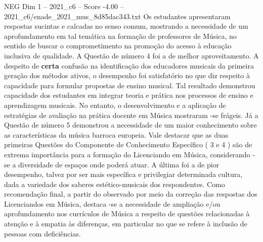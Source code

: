 \begin{textsample}{NEG Dim 1 – 2021\_c6 – Score -4.00 – 2021\_c6/enade\_2021\_mus\_8d85dac343.txt}
Os estudantes apresentaram respostas sucintas e calcadas no senso comum, mostrando a necessidade de um aprofundamento em tal temática na formação de professores de Música, no sentido de buscar o comprometimento na promoção do acesso à educação inclusiva de qualidade.
A Questão de número 4 foi a de melhor aproveitamento.
A despeito de \textbf{certa} confusão na identificação dos educadores musicais da primeira geração dos métodos ativos, o desempenho foi satisfatório no que diz respeito à capacidade para formular propostas de ensino musical.
Tal resultado demonstrou capacidade dos estudantes em integrar teoria e prática nos processos de ensino e aprendizagem musicais.
No entanto, o desenvolvimento e a aplicação de estratégias de avaliação na prática docente em Música mostraram -se frágeis.
Já a Questão de número 5 demonstrou a necessidade de um maior conhecimento sobre as características da música barroca europeia.
Vale destacar que as duas primeiras Questões do Componente de Conhecimento Específico ( 3 e 4 ) são de extrema importância para a formação do Licenciando em Música, considerando -se a diversidade de espaços onde poderá atuar.
A última foi a de pior desempenho, talvez por ser mais específica e privilegiar determinada cultura, dada a variedade dos saberes estético-musicais dos respondentes.
Como recomendação final, a partir do observado por meio da correção das respostas dos Licenciandos em Música, destaca -se a necessidade de ampliação e/ou aprofundamento nos currículos de Música a respeito de questões relacionadas à atenção e à empatia às diferenças, em particular no que se refere à inclusão de pessoas com deficiências.

\end{textsample}
